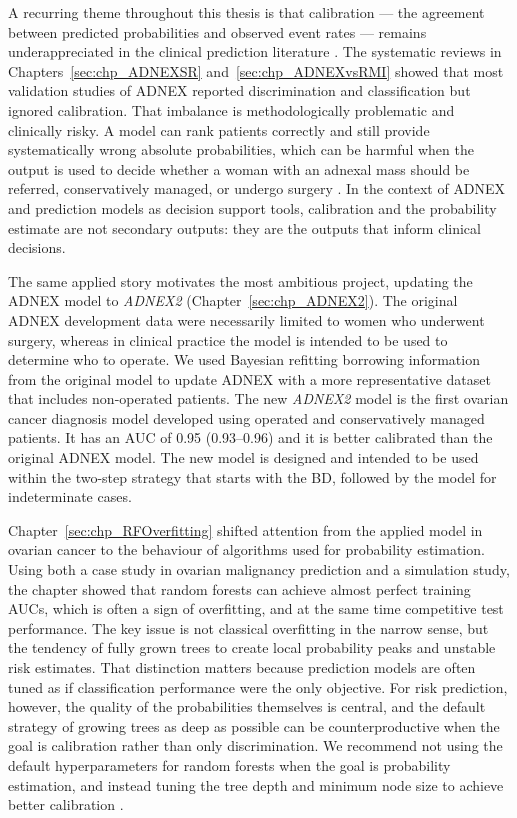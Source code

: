 A recurring theme throughout this thesis is that calibration --- the agreement between predicted probabilities and observed event rates --- remains underappreciated in the clinical prediction literature \cite{vancalsterCalibrationAchillesHeel2019}. The systematic reviews in Chapters~\ref{sec:chp_ADNEXSR} and~\ref{sec:chp_ADNEXvsRMI} showed that most validation studies of \gls{ADNEX} reported discrimination and classification but ignored calibration. That imbalance is methodologically problematic and clinically risky. A model can rank patients correctly and still provide systematically wrong absolute probabilities, which can be harmful when the output is used to decide whether a woman with an adnexal mass should be referred, conservatively managed, or undergo surgery \cite{vancalsterCalibrationRiskPrediction2015}. In the context of \gls{ADNEX} and prediction models as decision support tools, calibration and the probability estimate are not secondary outputs: they are the outputs that inform clinical decisions.

The same applied story motivates the most ambitious project, updating the ADNEX model to \emph{ADNEX2} (Chapter~\ref{sec:chp_ADNEX2}). The original \gls{ADNEX} development data were necessarily limited to women who underwent surgery, whereas in clinical practice the model is intended to be used to determine who to operate. We used Bayesian refitting borrowing information from the original model to update \gls{ADNEX} with a more representative dataset that includes non-operated patients. The new \emph{ADNEX2} model is the first ovarian cancer diagnosis model developed using operated and conservatively managed patients. It has an AUC of 0.95 (0.93--0.96)  and it is better calibrated than the original ADNEX model. The new model is designed and intended to be used within the two-step strategy that starts with the \gls{BD}, followed by the model for indeterminate cases. 

Chapter~\ref{sec:chp_RFOverfitting} shifted attention from the applied model in ovarian cancer to the behaviour of algorithms used for probability estimation. Using both a case study in ovarian malignancy prediction and a simulation study, the chapter showed that random forests can achieve almost perfect training \gls{AUC}s, which is often a sign of overfitting, and at the same time competitive test performance. The key issue is not classical overfitting in the narrow sense, but the tendency of fully grown trees to create local probability peaks and unstable risk estimates. That distinction matters because prediction models are often tuned as if classification performance were the only objective. For risk prediction, however, the quality of the probabilities themselves is central, and the default strategy of growing trees as deep as possible can be counterproductive when the goal is calibration rather than only discrimination. We recommend not using the default hyperparameters for random forests when the goal is probability estimation, and instead tuning the tree depth and minimum node size to achieve better calibration \cite{barrenadaUnderstandingOverfittingRandom2024}.

